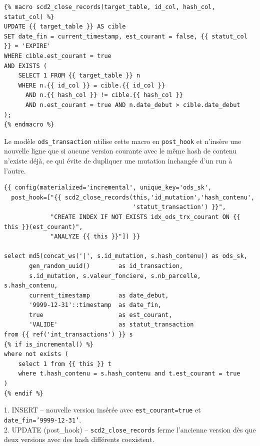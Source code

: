 \documentclass[12pt,a4paper]{article}
\newcommand{\sql}[1]{\texttt{\small #1}}
\begin{document}
\vspace{2.5em}


\begin{lstlisting}[language=Jinja, caption={Macro de fermeture SCD2 (post\_hook)}]
{% macro scd2_close_records(target_table, id_col, hash_col, statut_col) %}
UPDATE {{ target_table }} AS cible
SET date_fin = current_timestamp, est_courant = false, {{ statut_col }} = 'EXPIRE'
WHERE cible.est_courant = true
AND EXISTS (
    SELECT 1 FROM {{ target_table }} n
    WHERE n.{{ id_col }} = cible.{{ id_col }}
      AND n.{{ hash_col }} != cible.{{ hash_col }}
      AND n.est_courant = true AND n.date_debut > cible.date_debut
);
{% endmacro %}
\end{lstlisting}

Le modèle \texttt{ods\_transaction} utilise cette macro en \texttt{post\_hook}
et n'insère une nouvelle ligne que si aucune version courante avec le même
hash de contenu n'existe déjà, ce qui évite de dupliquer une mutation
inchangée d'un run à l'autre.

\vspace{2.5em}

\begin{lstlisting}[language=Jinja, caption={ods\_transaction.sql -- modèle incrémental SCD2}]
{{ config(materialized='incremental', unique_key='ods_sk',
  post_hook=["{{ scd2_close_records(this,'id_mutation','hash_contenu',
                                    'statut_transaction') }}",
             "CREATE INDEX IF NOT EXISTS idx_ods_trx_courant ON {{ this }}(est_courant)",
             "ANALYZE {{ this }}"]) }}

select md5(concat_ws('|', s.id_mutation, s.hash_contenu)) as ods_sk,
       gen_random_uuid()        as id_transaction,
       s.id_mutation, s.valeur_fonciere, s.nb_parcelle, s.hash_contenu,
       current_timestamp        as date_debut,
       '9999-12-31'::timestamp  as date_fin,
       true                     as est_courant,
       'VALIDE'                 as statut_transaction
from {{ ref('int_transactions') }} s
{% if is_incremental() %}
where not exists (
    select 1 from {{ this }} t
    where t.hash_contenu = s.hash_contenu and t.est_courant = true
)
{% endif %}
\end{lstlisting}

\begin{successbox}
1. INSERT -- nouvelle version insérée avec \sql{est\_courant=true} et \sql{date\_fin='9999-12-31'}.\\
2. UPDATE (post\_hook) -- \texttt{scd2\_close\_records} ferme l'ancienne version
dès que deux versions avec des hash différents coexistent.
\end{successbox}
\end{document}
